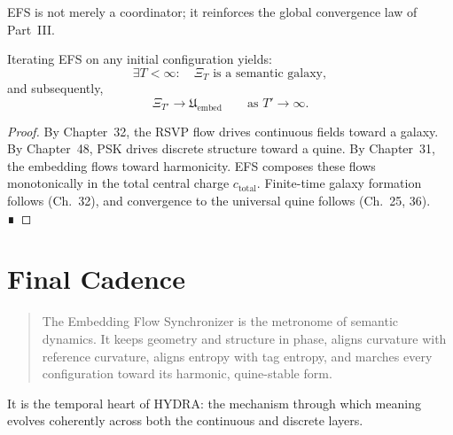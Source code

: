 EFS is not merely a coordinator; it reinforces the global convergence law of
Part~III.

\begin{theorem}
\label{thm:synch-irreversible}
Iterating EFS on any initial configuration yields:
\[
\exists T < \infty :\quad
\Xi_T \text{ is a semantic galaxy},
\]
and subsequently,
\[
\Xi_{T'} \to \mathfrak{U}_{\mathrm{embed}}
\qquad
\text{as } T' \to \infty.
\]
\end{theorem}

\begin{proof}
By Chapter~32, the RSVP flow drives continuous fields toward a galaxy.
By Chapter~48, PSK drives discrete structure toward a quine.
By Chapter~31, the embedding flows toward harmonicity.
EFS composes these flows monotonically in the total central charge
$c_{\mathrm{total}}$.
Finite-time galaxy formation follows (Ch.~32), and convergence to the
universal quine follows (Ch.~25, 36). ∎
\end{proof}

\section{Final Cadence}

\begin{quote}
The Embedding Flow Synchronizer is the metronome of semantic dynamics.
It keeps geometry and structure in phase,  
aligns curvature with reference curvature,  
aligns entropy with tag entropy,  
and marches every configuration toward its harmonic, quine-stable form.
\end{quote}

It is the temporal heart of HYDRA:  
the mechanism through which meaning evolves coherently across both the
continuous and discrete layers.

